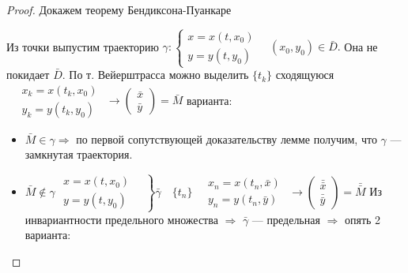 	\begin{proof}{ Докажем теорему Бендиксона-Пуанкаре} \vspace{3mm}
	
		Из точки выпустим траекторию $ \gamma: \left\{ \begin{gathered}
																				x = x(t, x_0) \\
																				y = y(t,y_0)
																			\end{gathered} \quad \right. (x_0, y_0) \in \bar{D}.
															$ Она не покидает $\bar{D}$.\vspace{3mm} \newline
		По т. Вейерштрасса можно выделить $\{t_k\}$ сходящуюся 
																			$\quad \begin{gathered}
																				x_k = x(t_k,x_0) \\
																				y_k = y(t_k,y_0)
																			\end{gathered} \,\, \rightarrow 
																			\begin{pmatrix} \bar{x}\\ \bar{y} \end{pmatrix} = \bar{M}
																			$  варианта:
		\begin{itemize}
			\item $\bar{M} \in \gamma \Rightarrow$ по первой сопутствующей доказательству лемме получим, что 
				$\gamma$ --- замкнутая траектория.
			\item  $\bar{M} \notin \gamma$ \newline
					$ \left. \begin{gathered}
										x = x(t, x_0) \\
										y = y(t,y_0)
									\end{gathered} \quad \right\} \bar{\gamma} \quad								 
								\{t_n\} \quad
								\begin{gathered}
									x_n = x(t_n,\bar{x}) \\
									y_n = y(t_n,\bar{y})
								\end{gathered} \,\, \rightarrow 
								\begin{pmatrix} \bar{\bar{x}}\\ \bar{\bar{y}} \end{pmatrix} = \bar{\bar{M}}
								$ \newline
				Из инвариантности предельного множества $\Rightarrow$ $\bar{\gamma}$ --- предельная 
					$\Rightarrow$ опять 2 варианта:
						\begin{itemize}

\end{itemize}
\end{itemize}
\end{proof}
